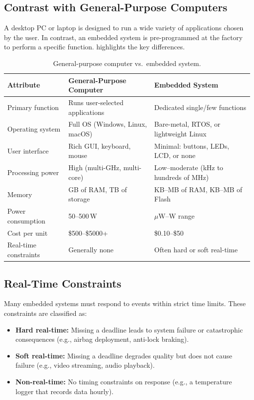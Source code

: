 \subsection{Contrast with General-Purpose Computers}

A desktop PC or laptop is designed to run a wide variety of applications chosen by the user. In contrast, an embedded system is pre-programmed at the factory to perform a specific function.  highlights the key differences.

\begin{table}[H]
\centering
\caption{General-purpose computer vs.\ embedded system.}
\label{tab:intro:gpvsemb}
\begin{tabularx}{\textwidth}{l X X}
\toprule
\textbf{Attribute} & \textbf{General-Purpose Computer} & \textbf{Embedded System} \\
\midrule
Primary function & Runs user-selected applications & Dedicated single/few functions \\
Operating system & Full OS (Windows, Linux, macOS) & Bare-metal, RTOS, or lightweight Linux \\
User interface & Rich GUI, keyboard, mouse & Minimal: buttons, LEDs, LCD, or none \\
Processing power & High (multi-GHz, multi-core) & Low--moderate (kHz to hundreds of MHz) \\
Memory & GB of RAM, TB of storage & KB--MB of RAM, KB--MB of Flash \\
Power consumption & 50--500\,W & $\mu$W--W range \\
Cost per unit & \$500--\$5000+ & \$0.10--\$50 \\
Real-time constraints & Generally none & Often hard or soft real-time \\
\bottomrule
\end{tabularx}
\end{table}

\subsection{Real-Time Constraints}

Many embedded systems must respond to events within strict time limits. These constraints are classified as:

\begin{itemize}
  \item \textbf{Hard real-time:} Missing a deadline leads to system failure or catastrophic consequences (e.g., airbag deployment, anti-lock braking).
  \item \textbf{Soft real-time:} Missing a deadline degrades quality but does not cause failure (e.g., video streaming, audio playback).
  \item \textbf{Non-real-time:} No timing constraints on response (e.g., a temperature logger that records data hourly).
\end{itemize}

